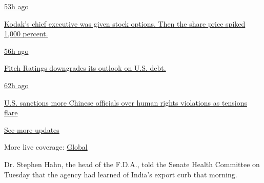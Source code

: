\href{https://www.nytimes.com/live/2020/07/31/business/stock-market-today-coronavirus?action=click\&pgtype=Article\&state=default\&region=MAIN_CONTENT_1\&context=storylines_live_updates\#kodaks-chief-executive-was-given-stock-options-then-the-share-price-spiked-1000-percent}{53h
ago}

\href{https://www.nytimes.com/live/2020/07/31/business/stock-market-today-coronavirus?action=click\&pgtype=Article\&state=default\&region=MAIN_CONTENT_1\&context=storylines_live_updates\#kodaks-chief-executive-was-given-stock-options-then-the-share-price-spiked-1000-percent}{Kodak's
chief executive was given stock options. Then the share price spiked
1,000 percent.}

\href{https://www.nytimes.com/live/2020/07/31/business/stock-market-today-coronavirus?action=click\&pgtype=Article\&state=default\&region=MAIN_CONTENT_1\&context=storylines_live_updates\#fitch-ratings-downgrades-its-outlook-on-us-debt}{56h
ago}

\href{https://www.nytimes.com/live/2020/07/31/business/stock-market-today-coronavirus?action=click\&pgtype=Article\&state=default\&region=MAIN_CONTENT_1\&context=storylines_live_updates\#fitch-ratings-downgrades-its-outlook-on-us-debt}{Fitch
Ratings downgrades its outlook on U.S. debt.}

\href{https://www.nytimes.com/live/2020/07/31/business/stock-market-today-coronavirus?action=click\&pgtype=Article\&state=default\&region=MAIN_CONTENT_1\&context=storylines_live_updates\#us-sanctions-more-chinese-officials-over-human-rights-violations-as-tensions-flare}{62h
ago}

\href{https://www.nytimes.com/live/2020/07/31/business/stock-market-today-coronavirus?action=click\&pgtype=Article\&state=default\&region=MAIN_CONTENT_1\&context=storylines_live_updates\#us-sanctions-more-chinese-officials-over-human-rights-violations-as-tensions-flare}{U.S.
sanctions more Chinese officials over human rights violations as
tensions flare}

\href{https://www.nytimes.com/live/2020/07/31/business/stock-market-today-coronavirus?action=click\&pgtype=Article\&state=default\&region=MAIN_CONTENT_1\&context=storylines_live_updates}{See
more updates}

More live coverage:
\href{https://www.nytimes.com/2020/08/01/world/coronavirus-covid-19.html?action=click\&pgtype=Article\&state=default\&region=MAIN_CONTENT_1\&context=storylines_live_updates}{Global}

Dr. Stephen Hahn, the head of the F.D.A., told the Senate Health
Committee on Tuesday that the agency had learned of India's export curb
that morning.


